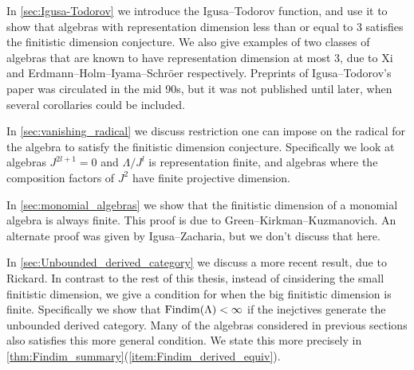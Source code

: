 In \cref{sec:Igusa-Todorov} we introduce the Igusa--Todorov function, and use it to show that algebras with representation dimension less than or equal to 3 satisfies the finitistic dimension conjecture. We also give examples of two classes of algebras that are known to have representation dimension at most 3, due to Xi and Erdmann--Holm--Iyama--Schröer respectively\cite{Xi02,EHIS04}. Preprints of Igusa--Todorov's paper\cite{IgTo05} was circulated in the mid 90s, but it was not published until later, when several corollaries could be included.

In \cref{sec:vanishing_radical} we discuss restriction one can impose on the radical for the algebra to satisfy the finitistic dimension conjecture. Specifically we look at algebras $J^{2l+1}=0$ and $\Lambda/J^l$ is representation finite, and algebras where the composition factors of $J^2$ have finite projective dimension.

In \cref{sec:monomial_algebras} we show that the finitistic dimension of a monomial algebra is always finite. This proof is due to Green--Kirkman--Kuzmanovich\cite{GKK91}. An alternate proof was given by Igusa--Zacharia\cite{IgZa90}, but we don't discuss that here.

In \cref{sec:Unbounded_derived_category} we discuss a more recent result, due to Rickard\cite{Rick19}. In contrast to the rest of this thesis, instead of cinsidering the small finitistic dimension, we give a condition for when the big finitistic dimension is finite. Specifically we show that $\operatorname{Findim}(\Lambda) < \infty$ if the inejctives generate the unbounded derived category. Many of the algebras considered in previous sections also satisfies this more general condition. We state this more precisely in \cref{thm:Findim_summary}(\ref{item:Findim_derived_equiv}).